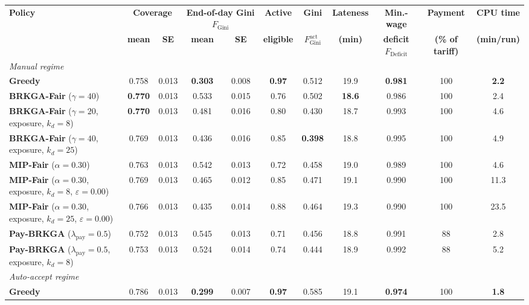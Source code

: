 \documentclass[a4paper,11pt,review,3p,authoryear]{elsarticle}
\newcommand{\FG}{F_{\text{Gini}}}
\newcommand{\FGa}{F_{\text{Gini}}^{\text{act}}}
\newcommand{\FD}{F_{\text{Deficit}}}
\begin{document}
\begin{table}
\centering
\begin{adjustbox}{max width=\textheight}
\begin{tabular}{l|cc|cc|c|c|c|c|c|c}
\hline
\multirow{2}{*}{\textbf{Policy}} & \multicolumn{2}{c|}{\textbf{Coverage}} & \multicolumn{2}{c|}{\textbf{End-of-day Gini $\FG$}} & \textbf{Active} & \textbf{Gini} & \textbf{Lateness} & \textbf{Min.-wage} & \textbf{Payment} & \textbf{CPU time} \\
 & \textbf{mean} & \textbf{SE} & \textbf{mean} & \textbf{SE} & \textbf{eligible} & $\FGa$ & \textbf{(min)} & \textbf{deficit $\FD$} & \textbf{(\% of tariff)} & \textbf{(min/run)} \\
\hline
\multicolumn{11}{l}{\textit{Manual regime}} \\
\textbf{Greedy} & 0.758 & 0.013 & \textbf{0.303} & 0.008 & \textbf{0.97} & 0.512 & 19.9 & \textbf{0.981} & 100 & \textbf{2.2} \\
\hline
\textbf{BRKGA-Fair} ($\gamma = 40$) & \textbf{0.770} & 0.013 & 0.533 & 0.015 & 0.76 & 0.502 & \textbf{18.6} & 0.986 & 100 & 2.4 \\
\textbf{BRKGA-Fair} ($\gamma = 20$, exposure, $k_d = 8$) & \textbf{0.770} & 0.013 & 0.481 & 0.016 & 0.80 & 0.430 & 18.7 & 0.993 & 100 & 4.6 \\
\textbf{BRKGA-Fair} ($\gamma = 40$, exposure, $k_d = 25$) & 0.769 & 0.013 & 0.436 & 0.016 & 0.85 & \textbf{0.398} & 18.8 & 0.995 & 100 & 4.9 \\
\textbf{MIP-Fair} ($\alpha = 0.30$) & 0.763 & 0.013 & 0.542 & 0.013 & 0.72 & 0.458 & 19.0 & 0.989 & 100 & 4.6 \\
\textbf{MIP-Fair} ($\alpha = 0.30$, exposure, $k_d = 8$, $\varepsilon = 0.00$) & 0.769 & 0.013 & 0.465 & 0.012 & 0.85 & 0.471 & 19.1 & 0.990 & 100 & 11.3 \\
\textbf{MIP-Fair} ($\alpha = 0.30$, exposure, $k_d = 25$, $\varepsilon = 0.00$) & 0.766 & 0.013 & 0.435 & 0.014 & 0.88 & 0.464 & 19.3 & 0.990 & 100 & 23.5 \\
\textbf{Pay-BRKGA} ($\lambda_{\text{pay}} = 0.5$) & 0.752 & 0.013 & 0.545 & 0.013 & 0.71 & 0.456 & 18.8 & 0.991 & 88 & 2.8 \\
\textbf{Pay-BRKGA} ($\lambda_{\text{pay}} = 0.5$, exposure, $k_d = 8$) & 0.753 & 0.013 & 0.524 & 0.014 & 0.74 & 0.444 & 18.9 & 0.992 & 88 & 5.2 \\
\hline
\multicolumn{11}{l}{\textit{Auto-accept regime}} \\
\textbf{Greedy} & 0.786 & 0.013 & \textbf{0.299} & 0.007 & \textbf{0.97} & 0.585 & 19.1 & \textbf{0.974} & 100 & \textbf{1.8} \\

\end{tabular}
\end{adjustbox}
\end{table}
\end{document}
